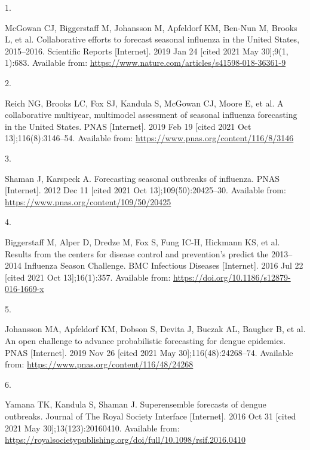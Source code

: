 \documentclass[
]{article}
\newlength{\cslhangindent}
\newlength{\csllabelwidth}
\newlength{\cslentryspacingunit} %
\newenvironment{CSLReferences}[2] %
 {%
  \setlength{\parindent}{0pt}
  \ifodd #1
  \let\oldpar\par
  \def\par{\hangindent=\cslhangindent\oldpar}
  \fi
  \setlength{\parskip}{#2\cslentryspacingunit}
 }%
 {}
\newcommand{\CSLLeftMargin}[1]{\parbox[t]{\csllabelwidth}{#1}}
\newcommand{\CSLRightInline}[1]{\parbox[t]{\linewidth - \csllabelwidth}{#1}\break}
\providecommand{\DIFaddend}{} %
\DeclareRobustCommand{\DIFaddend}{\DIFOaddend \let\includegraphics\DIFOincludegraphics} %
\begin{document}
\DIFaddend \hypertarget{refs}{}
\begin{CSLReferences}{0}{0}
\leavevmode{}%
\CSLLeftMargin{1. }
\CSLRightInline{McGowan CJ, Biggerstaff M, Johansson M, Apfeldorf KM, Ben-Nun M, Brooks L, et al. Collaborative efforts to forecast seasonal influenza in the {United States}, 2015--2016. Scientific Reports {[}Internet{]}. 2019 Jan 24 {[}cited 2021 May 30{]};9(1, 1):683. Available from: \url{https://www.nature.com/articles/s41598-018-36361-9}}

\leavevmode{}%
\CSLLeftMargin{2. }
\CSLRightInline{Reich NG, Brooks LC, Fox SJ, Kandula S, McGowan CJ, Moore E, et al. A collaborative multiyear, multimodel assessment of seasonal influenza forecasting in the {United States}. PNAS {[}Internet{]}. 2019 Feb 19 {[}cited 2021 Oct 13{]};116(8):3146--54. Available from: \url{https://www.pnas.org/content/116/8/3146}}

\leavevmode{}%
\CSLLeftMargin{3. }
\CSLRightInline{Shaman J, Karspeck A. Forecasting seasonal outbreaks of influenza. PNAS {[}Internet{]}. 2012 Dec 11 {[}cited 2021 Oct 13{]};109(50):20425--30. Available from: \url{https://www.pnas.org/content/109/50/20425}}

\leavevmode{}%
\CSLLeftMargin{4. }
\CSLRightInline{Biggerstaff M, Alper D, Dredze M, Fox S, Fung IC-H, Hickmann KS, et al. Results from the centers for disease control and prevention's predict the 2013--2014 {Influenza Season Challenge}. BMC Infectious Diseases {[}Internet{]}. 2016 Jul 22 {[}cited 2021 Oct 13{]};16(1):357. Available from: \url{https://doi.org/10.1186/s12879-016-1669-x}}

\leavevmode{}%
\CSLLeftMargin{5. }
\CSLRightInline{Johansson MA, Apfeldorf KM, Dobson S, Devita J, Buczak AL, Baugher B, et al. An open challenge to advance probabilistic forecasting for dengue epidemics. PNAS {[}Internet{]}. 2019 Nov 26 {[}cited 2021 May 30{]};116(48):24268--74. Available from: \url{https://www.pnas.org/content/116/48/24268}}

\leavevmode{}%
\CSLLeftMargin{6. }
\CSLRightInline{Yamana TK, Kandula S, Shaman J. Superensemble forecasts of dengue outbreaks. Journal of The Royal Society Interface {[}Internet{]}. 2016 Oct 31 {[}cited 2021 May 30{]};13(123):20160410. Available from: \url{https://royalsocietypublishing.org/doi/full/10.1098/rsif.2016.0410}}


\end{CSLReferences}
\end{document}
